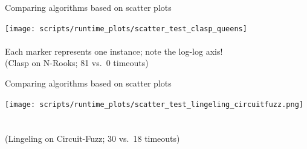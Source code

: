 \begin{frame}[c]{Comparing algorithms based on scatter plots}

\begin{center}
\texttt{[image: scripts/runtime\_plots/scatter\_test\_clasp\_queens]}\\~\\
\vspace*{-0.5cm}
Each marker represents one instance; note the \alert{log-log axis}!\\
\vspace*{0.2cm}
(Clasp on N-Rooks; 81 vs.\ 0 timeouts)
 
\end{center}

\end{frame}

\begin{frame}[c]{Comparing algorithms based on scatter plots}

\begin{center}
\texttt{[image: scripts/runtime\_plots/scatter\_test\_lingeling\_circuitfuzz.png]}\\~\\
\vspace*{-0.5cm}
~\\
\vspace*{0.2cm}
(Lingeling on Circuit-Fuzz; 30 vs.\ 18 timeouts)
\end{center}

\end{frame}



